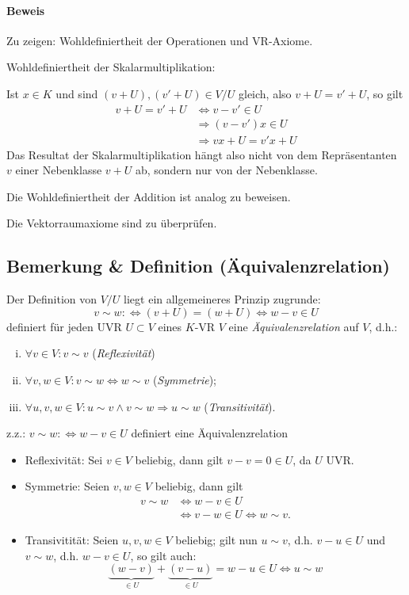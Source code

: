 \paragraph{Beweis}
	Zu zeigen: Wohldefiniertheit der Operationen und VR-Axiome.
	
	Wohldefiniertheit der Skalarmultiplikation:
	
	Ist $x\in K$ und sind $(v+U),(v'+U)\in V/U$ gleich, also $v+U = v'+U$, so gilt
		\begin{align*}
		v+U = v'+U &\Leftrightarrow v - v'\in U \\
		&\Rightarrow (v-v')x \in U \\
		&\Rightarrow vx+U=v' x+U
		\end{align*}
	Das Resultat der Skalarmultiplikation hängt also nicht von dem Repräsentanten $v$ einer Nebenklasse $v+U$ ab, sondern nur von der Nebenklasse.
	
	Die Wohldefiniertheit der Addition ist analog zu beweisen.
	
	Die Vektorraumaxiome sind zu überprüfen.

\subsection{Bemerkung \& Definition (Äquivalenzrelation)}
	\begin{Definition}[Äquivalenzrelation]
		Der Definition von $ V/U $ liegt ein allgemeineres Prinzip zugrunde:	
		\[ v\sim w :\Leftrightarrow (v+U)= (w+U) \Leftrightarrow w-v \in U \]
	definiert für jeden UVR $ U\subset V $ eines $ K $-VR $ V $ eine \emph{Äquivalenzrelation} auf $ V $, d.h.:
		\begin{enumerate}[(i)]
			\item $ \forall v\in V: v\sim v $ (\emph{Reflexivität})
			\item $ \forall v,w\in V: v\sim w\Leftrightarrow w\sim v $ (\emph{Symmetrie});
			\item $ \forall u,v,w\in V: u\sim v\land v\sim w\Rightarrow u\sim w $ (\emph{Transitivität}).
		\end{enumerate}
	\end{Definition}

        z.z.: $ v\sim w:\Leftrightarrow w-v\in U $ definiert eine Äquivalenzrelation
	
	\begin{itemize}
		\item Reflexivität: Sei $ v\in V $ beliebig, dann gilt $ v-v=0\in U $, da $ U $ UVR.
		\item Symmetrie: Seien $ v,w\in V $ beliebig, dann gilt
			\begin{align*}
			v\sim w 	&\Leftrightarrow w-v\in U\\
						&\Leftrightarrow v-w\in U \Leftrightarrow w\sim v.
			\end{align*}
		\item Transivitität: Seien $ u,v,w\in V $ beliebig; gilt nun
			$u\sim v$, d.h. $v-u\in U$ und $v\sim w$, d.h. $w-v\in U$, so gilt auch:
			\[\underbrace{(w-v)}_{\in U}+\underbrace{(v-u)}_{\in U}= w-u\in U \Leftrightarrow u\sim w\]
	\end{itemize}
	
